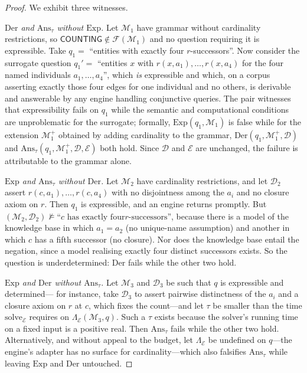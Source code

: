 \documentclass[11pt,a4paper]{article}
\theoremstyle{plain}
\theoremstyle{definition}
\theoremstyle{remark}
\newcommand{\Model}{\mathcal{M}}          %
\newcommand{\Corpus}{\mathcal{D}}         %
\newcommand{\Engine}{\mathcal{E}}         %
\newcommand{\Feat}{\mathcal{F}}           %
\newcommand{\lowr}{\Lambda}               %
\newcommand{\qq}{q}
\begin{document}
\begin{proof}
We exhibit three witnesses.

\emph{$\mathrm{Der}$ and $\mathrm{Ans}_\tau$ without $\mathrm{Exp}$.} Let
$\Model_1$ have grammar without cardinality restrictions, so
$\textsf{COUNTING} \notin \Feat(\Model_1)$ and no question requiring it is
expressible. Take $\qq_1 = $ ``entities with exactly four $r$-successors''.
Now consider the surrogate question $\qq_1' = $ ``entities $x$ with
$r(x,a_1),\dots,r(x,a_4)$ for the four named individuals $a_1,\dots,a_4$'',
which \emph{is} expressible and which, on a corpus asserting exactly those four
edges for one individual and no others, is derivable and answerable by any
engine handling conjunctive queries. The pair witnesses that expressibility
fails on $\qq_1$ while the semantic and computational conditions are
unproblematic for the surrogate; formally, $\mathrm{Exp}(\qq_1, \Model_1)$ is
false while for the extension $\Model_1^+$ obtained by adding cardinality to
the grammar, $\mathrm{Der}(\qq_1, \Model_1^+, \Corpus)$ and
$\mathrm{Ans}_\tau(\qq_1, \Model_1^+, \Corpus, \Engine)$ both hold. Since
$\Corpus$ and $\Engine$ are unchanged, the failure is attributable to the
grammar alone.

\emph{$\mathrm{Exp}$ and $\mathrm{Ans}_\tau$ without $\mathrm{Der}$.} Let
$\Model_2$ have cardinality restrictions, and let $\Corpus_2$ assert
$r(c,a_1),\dots,r(c,a_4)$ with no disjointness among the $a_i$ and no closure
axiom on $r$. Then $\qq_1$ is expressible, and an engine returns promptly. But
$(\Model_2, \Corpus_2) \not\models \text{``$c$ has exactly four
$r$-successors''}$, because there is a model of the knowledge base in which
$a_1 = a_2$ (no unique-name assumption) and another in which $c$ has a fifth
successor (no closure). Nor does the knowledge base entail the negation, since
a model realising exactly four distinct successors exists. So the question is
underdetermined: $\mathrm{Der}$ fails while the other two hold.

\emph{$\mathrm{Exp}$ and $\mathrm{Der}$ without $\mathrm{Ans}_\tau$.} Let
$\Model_3$ and $\Corpus_3$ be such that $\qq$ is expressible and determined---
for instance, take $\Corpus_3$ to assert pairwise distinctness of the $a_i$
and a closure axiom on $r$ at $c$, which fixes the count---and let $\tau$ be
smaller than the time $\mathrm{solve}_\Engine$ requires on
$\lowr_\Engine(\Model_3,\qq)$. Such a $\tau$ exists because the solver's
running time on a fixed input is a positive real. Then $\mathrm{Ans}_\tau$
fails while the other two hold. Alternatively, and without appeal to the
budget, let $\lowr_\Engine$ be undefined on $\qq$---the engine's adapter has no
surface for cardinality---which also falsifies $\mathrm{Ans}_\tau$ while
leaving $\mathrm{Exp}$ and $\mathrm{Der}$ untouched.
\end{proof}
\end{document}
